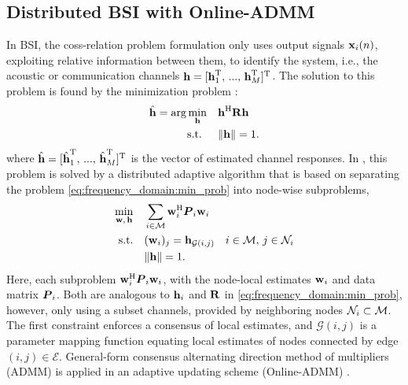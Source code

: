 \documentclass{article}
\begin{document}
\subsection[]{Distributed BSI with Online-ADMM}
In BSI, the coss-relation problem formulation only uses output signals \(\bm{\mathrm{x}}_i(n)\), exploiting relative information between them, to identify the system, i.e., the acoustic or communication channels \(\bm{\mathrm{h}} = [\bm{\mathrm{h}}_1^{\mathrm{T}},\,...,\,\bm{\mathrm{h}}_M^{\mathrm{T}}]^{\mathrm{T}}\).
The solution to this problem is found by the minimization problem \cite{langtongBlindIdentificationEqualization1994,huangAdaptiveMultichannelLeast2002,huangClassFrequencydomainAdaptive2003,blochbergerDBSI}:
\begin{equation}
    \begin{aligned}
        \hat{\bm{\mathrm{h}}} = \arg \min_{\bm{\mathrm{h}}} \quad &\bm{\mathrm{h}}^{\mathrm{H}} \bm{\mathrm{R}} \bm{\mathrm{h}} \\
        \text{s.t. } \quad &\|\bm{\mathrm{h}}\| = 1.
    \end{aligned}\label{eq:frequency_domain:min_prob}
\end{equation}
where \(\hat{\bm{\mathrm{h}}} = [\hat{\bm{\mathrm{h}}}_1^{\mathrm{T}},\,...,\,\hat{\bm{\mathrm{h}}}_M^{\mathrm{T}}]^{\mathrm{T}}\) is the vector of estimated channel responses.
In \cite{blochbergerDBSI}, this problem is solved by a distributed adaptive algorithm that is based on separating the problem \eqref{eq:frequency_domain:min_prob} into node-wise subproblems,
\begin{equation}
    \begin{aligned}
        \underset{\bm{\mathrm{w}},\,\bm{\mathrm{h}}}{\min} \quad &\sum_{i \in \mathcal{M}} \bm{\mathrm{w}}_i^{\mathrm{H}} {\bm{{P}}}_i \bm{\mathrm{w}}_i\\
        \text{s.t.} \quad &(\bm{\mathrm{w}}_i)_j = \bm{\mathrm{h}}_{\mathcal{G}(i,j)}\quad i \in \mathcal{M},\,j \in \mathcal{N}_i\\
        &\|\bm{\mathrm{h}}\| = 1.
    \end{aligned}\label{eq:general_consensus_admm:min_prob}
\end{equation}
Here, each subproblem \(\bm{\mathrm{w}}_i^{\mathrm{H}} {\bm{{P}}}_i \bm{\mathrm{w}}_i\), with the node-local estimates \(\bm{\mathrm{w}}_i\) and data matrix \({\bm{{P}}}_i\).
Both are analogous to \(\bm{\mathrm{h}}_i\) and \(\bm{\mathrm{R}}\) in \eqref{eq:frequency_domain:min_prob}, however, only using a subset channels, provided by neighboring nodes \(\mathcal{N}_i \subset \mathcal{M}\).
The first constraint enforces a consensus of local estimates, and \(\mathcal{G}(i,j)\) is a parameter mapping function equating local estimates of nodes connected by edge \((i,j) \in \mathcal{E}\).
General-form consensus alternating direction method of multipliers (ADMM) \cite{boydDistributedOptimizationStatistical2011} is applied in an adaptive updating scheme (Online-ADMM) \cite{wangOnlineAlternatingDirection2013,hosseiniOnlineDistributedADMM2014}.
\end{document}
